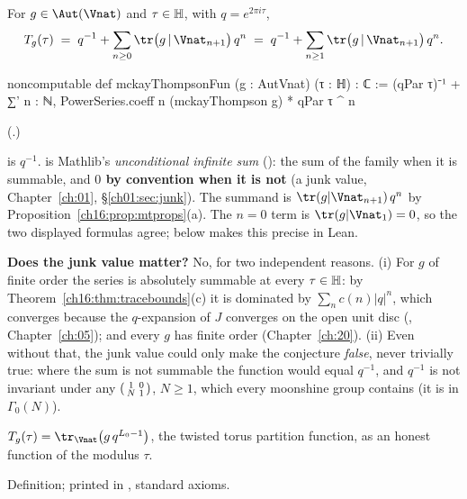 \begin{definition}\label{ch16:def:mtfun}
For $g\in\Aut(\Vnat)$ and $\tau\in\mathbb{H}$, with $q=e^{2\pi i\tau}$,
\begin{equation*}
  T_g(\tau)\;=\;q^{-1}+\sum_{n\ge0}\tr\bigl(g\,|\,\Vnat_{n+1}\bigr)\,q^n
  \;=\;q^{-1}+\sum_{n\ge1}\tr\bigl(g\,|\,\Vnat_{n+1}\bigr)\,q^n .
\end{equation*}
\end{definition}
\begin{leancode}
noncomputable def mckayThompsonFun (g : AutVnat) (τ : ℍ) : ℂ :=
  (qPar τ)⁻¹ + ∑' n : ℕ, PowerSeries.coeff n (mckayThompson g) * qPar τ ^ n
\end{leancode}
(.)
\begin{dictionary}
 is $q^{-1}$.   is Mathlib's \emph{unconditional infinite sum} ():
the sum of the family when it is summable, and \textbf{$0$ by convention when it is not} (a junk value,
Chapter~\ref{ch:01}, \S\ref{ch01:sec:junk}).  The summand is $\tr(g|\Vnat_{n+1})\,q^n$ by
Proposition~\ref{ch16:prop:mtprops}(a).  The $n=0$ term is $\tr(g|\Vnat_1)=0$, so the two displayed formulas agree;
 below makes this precise in Lean.

\textbf{Does the junk value matter?}  No, for two independent reasons.  (i) For $g$ of finite order the series is
absolutely summable at every $\tau\in\mathbb{H}$: by Theorem~\ref{ch16:thm:tracebounds}(c) it is dominated by
$\sum_n c(n)|q|^n$, which converges because the $q$-expansion of $J$ converges on the open unit disc
(, Chapter~\ref{ch:05}); and every $g$ has finite order (Chapter~\ref{ch:20}).  (ii) Even
without that, the junk value could only make the conjecture \emph{false}, never trivially true: where the sum is not
summable the function would equal $q^{-1}$, and $q^{-1}$ is not invariant under any $\left(\begin{smallmatrix}1&0\\N&1\end{smallmatrix}\right)$, $N\ge1$,
which every moonshine group contains (it is in $\Gamma_0(N)$).
\end{dictionary}
\begin{physics}
$T_g(\tau)=\tr_{\Vnat}\bigl(g\,q^{L_0-1}\bigr)$, the twisted torus partition function, as an honest function of the
modulus $\tau$.
\end{physics}
\begin{status}
Definition; printed in , standard axioms.
\end{status}

